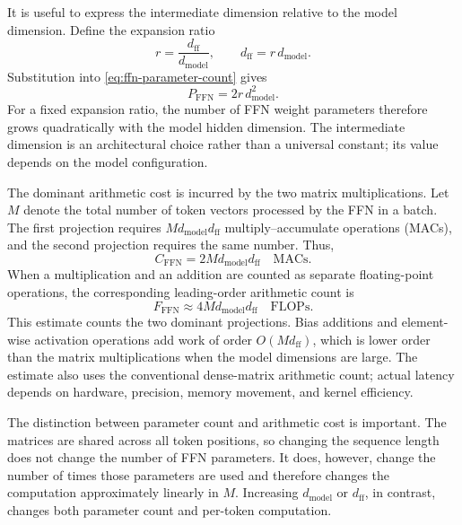 It is useful to express the intermediate dimension relative to the model
dimension. Define the expansion ratio
\begin{equation}
    r
    =
    \frac{d_{\mathrm{ff}}}{d_{\mathrm{model}}},
    \qquad
    d_{\mathrm{ff}}=r\,d_{\mathrm{model}}.
    \label{eq:ffn-expansion-ratio}
\end{equation}
Substitution into \cref{eq:ffn-parameter-count} gives
\begin{equation}
    P_{\mathrm{FFN}}
    =
    2r\,d_{\mathrm{model}}^2.
    \label{eq:ffn-parameter-expansion}
\end{equation}
For a fixed expansion ratio, the number of FFN weight parameters therefore
grows quadratically with the model hidden dimension. The intermediate
dimension is an architectural choice rather than a universal constant; its
value depends on the model configuration.

The dominant arithmetic cost is incurred by the two matrix
multiplications. Let \(M\) denote the total number of token vectors
processed by the FFN in a batch. The first projection requires
\(M d_{\mathrm{model}}d_{\mathrm{ff}}\) multiply--accumulate operations
(MACs), and the second projection requires the same number. Thus,
\begin{equation}
    C_{\mathrm{FFN}}
    =
    2M d_{\mathrm{model}}d_{\mathrm{ff}}
    \quad\text{MACs}.
    \label{eq:ffn-macs}
\end{equation}
When a multiplication and an addition are counted as separate
floating-point operations, the corresponding leading-order arithmetic
count is
\begin{equation}
    F_{\mathrm{FFN}}
    \approx
    4M d_{\mathrm{model}}d_{\mathrm{ff}}
    \quad\text{FLOPs}.
    \label{eq:ffn-flops}
\end{equation}
This estimate counts the two dominant projections. Bias additions and
element-wise activation operations add work of order
\(O(Md_{\mathrm{ff}})\), which is lower order than the matrix
multiplications when the model dimensions are large. The estimate also
uses the conventional dense-matrix arithmetic count; actual latency
depends on hardware, precision, memory movement, and kernel efficiency.

The distinction between parameter count and arithmetic cost is important.
The matrices are shared across all token positions, so changing the
sequence length does not change the number of FFN parameters. It does,
however, change the number of times those parameters are used and
therefore changes the computation approximately linearly in \(M\).
Increasing \(d_{\mathrm{model}}\) or \(d_{\mathrm{ff}}\), in contrast,
changes both parameter count and per-token computation.

